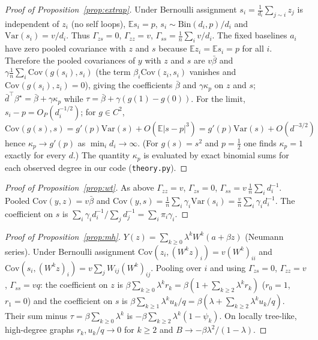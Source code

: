 \begin{proof}[Proof of Proposition~\ref{prop:extrap}]
Under Bernoulli assignment $s_i=\frac1{d_i}\sum_{j\sim i}z_j$ is independent of $z_i$ (no self loops), $\mathbb E s_i=p$, $s_i\sim\mathrm{Bin}(d_i,p)/d_i$ and $\mathrm{Var}(s_i)=v/d_i$. Thus $\Gamma_{zs}=0$, $\Gamma_{zz}=v$, $\Gamma_{ss}=\frac1n\sum_iv/d_i$. The fixed baselines $a_i$ have zero pooled covariance with $z$ and $s$ because $\mathbb E z_i=\mathbb E s_i=p$ for all $i$. Therefore the pooled covariances of $y$ with $z$ and $s$ are $v\bar\beta$ and $\gamma\frac1n\sum_i\mathrm{Cov}(g(s_i),s_i)$ (the term $\beta_i\mathrm{Cov}(z_i,s_i)$ vanishes and $\mathrm{Cov}(g(s_i),z_i)=0$), giving the coefficients $\bar\beta$ and $\gamma\kappa_p$ on $z$ and $s$; $\bar d^\top\beta^\star=\bar\beta+\gamma\kappa_p$ while $\tau=\bar\beta+\gamma(g(1)-g(0))$. For the limit, $s_i-p=O_P(d_i^{-1/2})$; for $g\in C^2$, $\mathrm{Cov}(g(s),s)=g'(p)\mathrm{Var}(s)+O(\mathbb E|s-p|^3)=g'(p)\mathrm{Var}(s)+O(d^{-3/2})$ hence $\kappa_p\to g'(p)$ as $\min_id_i\to\infty$. (For $g(s)=s^2$ and $p=\frac12$ one finds $\kappa_p=1$ exactly for every $d$.) The quantity $\kappa_p$ is evaluated by exact binomial sums for each observed degree in our code (\texttt{theory.py}).
\end{proof}

\begin{proof}[Proof of Proposition~\ref{prop:wt}]
As above $\Gamma_{zz}=v$, $\Gamma_{zs}=0$, $\Gamma_{ss}=v\,\frac1n\sum_id_i^{-1}$. Pooled $\mathrm{Cov}(y,z)=v\bar\beta$ and $\mathrm{Cov}(y,s)=\frac1n\sum_i\gamma_i\mathrm{Var}(s_i)=\frac vn\sum_i\gamma_id_i^{-1}$. The coefficient on $s$ is $\sum_i\gamma_id_i^{-1}/\sum_jd_j^{-1}=\sum_i\pi_i\gamma_i$.
\end{proof}

\begin{proof}[Proof of Proposition~\ref{prop:mh}]
$Y(z)=\sum_{k\ge0}\lambda^kW^k(a+\beta z)$ (Neumann series). Under Bernoulli assignment $\mathrm{Cov}(z_i,(W^kz)_i)=v(W^k)_{ii}$ and $\mathrm{Cov}(s_i,(W^kz)_i)=v\sum_jW_{ij}(W^k)_{ij}$. Pooling over $i$ and using $\Gamma_{zs}=0$, $\Gamma_{zz}=v$, $\Gamma_{ss}=vq$: the coefficient on $z$ is $\beta\sum_{k\ge0}\lambda^kr_k=\beta(1+\sum_{k\ge2}\lambda^kr_k)$ ($r_0=1$, $r_1=0$) and the coefficient on $s$ is $\beta\sum_{k\ge1}\lambda^ku_k/q=\beta(\lambda+\sum_{k\ge2}\lambda^ku_k/q)$. Their sum minus $\tau=\beta\sum_{k\ge0}\lambda^k$ is $-\beta\sum_{k\ge2}\lambda^k(1-\psi_k)$. On locally tree-like, high-degree graphs $r_k,u_k/q\to0$ for $k\ge2$ and $B\to-\beta\lambda^2/(1-\lambda)$.
\end{proof}
